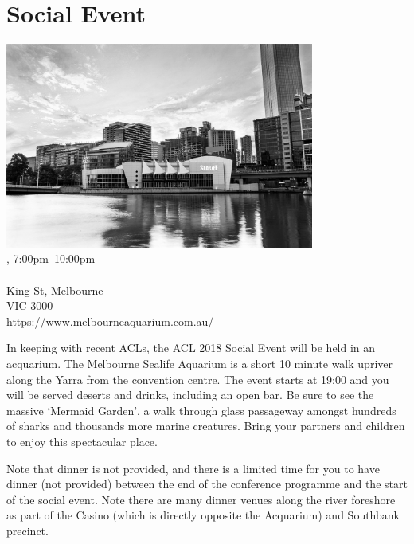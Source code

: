 \clearpage
\section{Social Event}
\setheaders{}{\daydateyear}

\begin{center}

\includegraphics[width=4in]{day2/aquarium.jpg} \\


\daydateyear, 7:00pm--10:00pm \vspace{1em}\\
\SocialLoc\\
King St, Melbourne \\
VIC 3000 \\
\url{https://www.melbourneaquarium.com.au/}
\end{center}

In keeping with recent ACLs, the ACL 2018 Social Event will be held in an
acquarium.  The Melbourne Sealife Aquarium is a short 10 minute walk upriver
along the Yarra from the convention centre. The event starts at 19:00 and you
will be served deserts and drinks, including an open bar.  Be sure to see the
massive `Mermaid Garden', a walk through glass passageway amongst hundreds of
sharks and thousands more marine creatures. Bring your partners and children 
to enjoy this spectacular place.

Note that dinner is not provided, and there is a limited time for you to have
dinner (not provided) between the end of the conference programme and the start
of the social event. Note there are many dinner venues along the river
foreshore as part of the Casino (which is directly opposite the Acquarium) 
and Southbank precinct.

